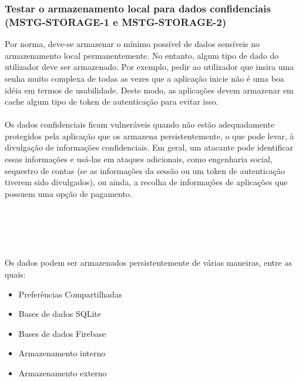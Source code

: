 \subsubsection{Testar o armazenamento local para dados confidenciais (MSTG-STORAGE-1 e MSTG-STORAGE-2)}\par
\hfill\par
\hfill\par
Por norma, deve-se armazenar o mínimo possível de dados sensíveis no armazenamento local permanentemente. No entanto, algum tipo de dado do utilizador deve ser armazenado. Por exemplo, pedir ao utilizador que insira uma senha muito complexa de todas as vezes que a aplicação inicie não é uma boa idéia em termos de usabilidade. Deste modo, as aplicações devem armazenar em cache algum tipo de token de autenticação para evitar isso.
\\
\\
Os dados confidenciais ficam vulneráveis quando não estão adequadamente protegidos pela aplicação que os armazena persistentemente, o que pode levar, à divulgação de informações confidenciais. Em geral, um atacante pode identificar essas informações e usá-las em ataques adicionais, como engenharia social, sequestro de contas (se as informações da sessão ou um token de autenticação tiverem sido divulgados), ou ainda, a recolha de informações de aplicações que possuem uma opção de pagamento.
\\
\\
\\
\\
\\
\\
Os dados podem ser armazenados persistentemente de várias maneiras, entre as quais:
\begin{itemize}
    \item Preferências Compartilhadas
    \item Bases de dados SQLite
    \item Bases de dados Firebase
    \item Armazenamento interno
    \item Armazenamento externo
\end{itemize}


